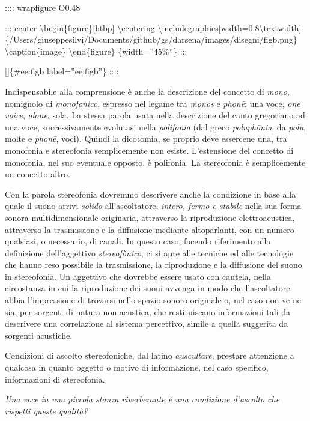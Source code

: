 \documentclass[a4paper,11pt]{article}
\begin{document}
:::: wrapfigure
O0.48

::: center
\textbackslash{}begin\{figure\}{[}htbp{]}
  \textbackslash{}centering
  \textbackslash{}includegraphics{[}width=0.8\textbackslash{}textwidth{]}\{/Users/giuseppesilvi/Documents/github/gs/darsena/images/disegni/figb.png\}
  \textbackslash{}caption\{image\}
\textbackslash{}end\{figure\}
\{width=''45\%''\}
:::

{[}{]}\{\#ee:figb label=''ee:figb''\}
::::

Indispensabile alla comprensione è anche la descrizione del concetto di
\emph{mono}, nomignolo di \emph{monofonico}, espresso nel legame tra \emph{monos} e
\emph{phonē}: una voce, \emph{one voice}, \emph{alone}, sola. La stessa parola usata
nella descrizione del canto gregoriano ad una voce, successivamente
evolutasi nella \emph{polifonia} (dal greco \emph{poluphōnia}, da \emph{polu}, molte e
\emph{phonē}, voci). Quindi la dicotomia, se proprio deve essercene una, tra
monofonia e stereofonia semplicemente non esiste. L'estensione del
concetto di monofonia, nel suo eventuale opposto, è polifonia. La
stereofonia è semplicemente un concetto altro.

Con la parola stereofonia dovremmo descrivere anche la condizione in
base alla quale il suono arrivi \emph{solido} all'ascoltatore, \emph{intero, fermo
e stabile} nella sua forma sonora multidimensionale originaria,
attraverso la riproduzione elettroacustica, attraverso la trasmissione e
la diffusione mediante altoparlanti, con un numero qualsiasi, o
necessario, di canali. In questo caso, facendo riferimento alla
definizione dell'aggettivo \emph{stereofònico}, ci si apre alle tecniche ed
alle tecnologie che hanno reso possibile la trasmissione, la
riproduzione e la diffusione del suono in stereofonia. Un aggettivo che
dovrebbe essere usato con cautela, nella circostanza in cui la
riproduzione dei suoni avvenga in modo che l'ascoltatore abbia
l'impressione di trovarsi nello spazio sonoro originale o, nel caso non
ve ne sia, per sorgenti di natura non acustica, che restituiscano
informazioni tali da descrivere una correlazione al sistema percettivo,
simile a quella suggerita da sorgenti acustiche.

Condizioni di ascolto stereofoniche, dal latino \emph{auscultare}, prestare
attenzione a qualcosa in quanto oggetto o motivo di informazione, nel
caso specifico, informazioni di stereofonia.

\emph{Una voce in una piccola stanza riverberante è una condizione d'ascolto
che rispetti queste qualità?}
\end{document}

